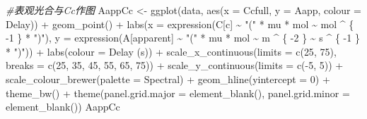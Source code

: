 \documentclass[
]{krantz}
\makeatletter
\newenvironment{Shaded}{\begin{snugshade}}{\end{snugshade}}
\newcommand{\AttributeTok}[1]{\textcolor[rgb]{0.77,0.63,0.00}{#1}}
\newcommand{\CommentTok}[1]{\textcolor[rgb]{0.56,0.35,0.01}{\textit{#1}}}
\newcommand{\DecValTok}[1]{\textcolor[rgb]{0.00,0.00,0.81}{#1}}
\newcommand{\FunctionTok}[1]{\textcolor[rgb]{0.00,0.00,0.00}{#1}}
\newcommand{\NormalTok}[1]{#1}
\newcommand{\OtherTok}[1]{\textcolor[rgb]{0.56,0.35,0.01}{#1}}
\newcommand{\SpecialCharTok}[1]{\textcolor[rgb]{0.00,0.00,0.00}{#1}}
\newcommand{\StringTok}[1]{\textcolor[rgb]{0.31,0.60,0.02}{#1}}
\newenvironment{kframe}{%
\medskip{}
\setlength{\fboxsep}{.8em}
 \def\at@end@of@kframe{}%
 \ifinner\ifhmode%
  \def\at@end@of@kframe{\end{minipage}}%
  \begin{minipage}{\columnwidth}%
 \fi\fi%
 \def\FrameCommand##1{\hskip\@totalleftmargin \hskip-\fboxsep
 \colorbox{shadecolor}{##1}\hskip-\fboxsep
     \hskip-\linewidth \hskip-\@totalleftmargin \hskip\columnwidth}%
 \MakeFramed {\advance\hsize-\width
   \@totalleftmargin\z@ \linewidth\hsize
   \@setminipage}}%
 {\par\unskip\endMakeFramed%
 \at@end@of@kframe}
\renewenvironment{Shaded}{\begin{kframe}}{\end{kframe}}
\makeatother
\begin{document}
\begin{Shaded}
\begin{Highlighting}[]
\CommentTok{\#表观光合与Cc作图}
\NormalTok{AappCc }\OtherTok{\textless{}{-}} \FunctionTok{ggplot}\NormalTok{(data, }\FunctionTok{aes}\NormalTok{(}\AttributeTok{x =}\NormalTok{ Ccfull, }\AttributeTok{y =}\NormalTok{ Aapp, }\AttributeTok{colour =}\NormalTok{ Delay)) }\SpecialCharTok{+}
  \FunctionTok{geom\_point}\NormalTok{() }\SpecialCharTok{+}
  \FunctionTok{labs}\NormalTok{(}\AttributeTok{x =} \FunctionTok{expression}\NormalTok{(C[c] }\SpecialCharTok{\textasciitilde{}} \StringTok{"("} \SpecialCharTok{*}\NormalTok{ mu }\SpecialCharTok{*}\NormalTok{ mol }\SpecialCharTok{\textasciitilde{}}\NormalTok{ mol }\SpecialCharTok{\^{}}\NormalTok{ \{}
    \SpecialCharTok{{-}}\DecValTok{1}
\NormalTok{  \} }\SpecialCharTok{*} \StringTok{")"}\NormalTok{),}
  \AttributeTok{y =} \FunctionTok{expression}\NormalTok{(A[apparent] }\SpecialCharTok{\textasciitilde{}} \StringTok{"("} \SpecialCharTok{*}\NormalTok{ mu }\SpecialCharTok{*}\NormalTok{ mol }\SpecialCharTok{\textasciitilde{}}\NormalTok{ m }\SpecialCharTok{\^{}}\NormalTok{ \{}
    \SpecialCharTok{{-}}\DecValTok{2}
\NormalTok{  \} }\SpecialCharTok{\textasciitilde{}}\NormalTok{ s }\SpecialCharTok{\^{}}\NormalTok{ \{}
    \SpecialCharTok{{-}}\DecValTok{1}
\NormalTok{  \} }\SpecialCharTok{*} \StringTok{")"}\NormalTok{)) }\SpecialCharTok{+}
  \FunctionTok{labs}\NormalTok{(}\AttributeTok{colour =} \StringTok{\textquotesingle{}Delay (s)\textquotesingle{}}\NormalTok{) }\SpecialCharTok{+}
  \FunctionTok{scale\_x\_continuous}\NormalTok{(}\AttributeTok{limits =} \FunctionTok{c}\NormalTok{(}\DecValTok{25}\NormalTok{, }\DecValTok{75}\NormalTok{),}
                     \AttributeTok{breaks =} \FunctionTok{c}\NormalTok{(}\DecValTok{25}\NormalTok{, }\DecValTok{35}\NormalTok{, }\DecValTok{45}\NormalTok{, }\DecValTok{55}\NormalTok{, }\DecValTok{65}\NormalTok{, }\DecValTok{75}\NormalTok{)) }\SpecialCharTok{+}
  \FunctionTok{scale\_y\_continuous}\NormalTok{(}\AttributeTok{limits =} \FunctionTok{c}\NormalTok{(}\SpecialCharTok{{-}}\DecValTok{5}\NormalTok{, }\DecValTok{5}\NormalTok{)) }\SpecialCharTok{+}
  \FunctionTok{scale\_colour\_brewer}\NormalTok{(}\AttributeTok{palette =} \StringTok{\textquotesingle{}Spectral\textquotesingle{}}\NormalTok{) }\SpecialCharTok{+}
  \FunctionTok{geom\_hline}\NormalTok{(}\AttributeTok{yintercept =} \DecValTok{0}\NormalTok{) }\SpecialCharTok{+}
  \FunctionTok{theme\_bw}\NormalTok{() }\SpecialCharTok{+}
  \FunctionTok{theme}\NormalTok{(}\AttributeTok{panel.grid.major =} \FunctionTok{element\_blank}\NormalTok{(),}
        \AttributeTok{panel.grid.minor =} \FunctionTok{element\_blank}\NormalTok{())}
\NormalTok{AappCc}
\end{Highlighting}
\end{Shaded}
\end{document}
